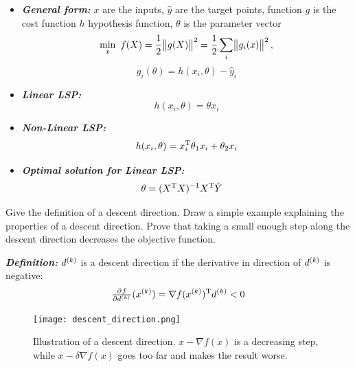 \documentclass[12pt,a4paper]{article}
\begin{document}
\begin{itemize}
    \item[] \textbf{\textit{General form:}} $x$ are the inputs, $\hat{y}$ are the target points, function $g$ is the cost function $h$ hypothesis function, $\theta$ is the parameter vector
        \begin{equation*}
          \underset{x}{\text{min}} \enspace f(X) = \frac{1}{2} \enVert[1]{g(X)}^2 = \frac{1}{2} \sum_i \enVert[1]{g_i(x)}^2,
        \end{equation*}
        \begin{equation*}
          g_i(\theta) = h(x_i, \theta) - \hat{y}_i
        \end{equation*}
    \item[] \textbf{\textit{Linear LSP:}}
        \begin{equation*}
            h(x_i, \theta) = \theta x_i
        \end{equation*}
    \item[] \textbf{\textit{Non-Linear LSP:}}
        \begin{equation*}
            h(x_i, \theta) = x_i^{\mathrm{T}} \theta_{1} x_i + \theta_{2} x_i
        \end{equation*}
    \item[] \textbf{\textit{Optimal solution for Linear LSP:}}
        \begin{align*}
           \theta &= (X^{\mathrm{T}}X)^{-1}X^{\mathrm{T}}\hat{Y}
        \end{align*}
\end{itemize}

\begin{question}
Give the definition of a descent direction. Draw a simple example explaining the properties of a descent direction. Prove that taking a small enough step along the descent direction decreases the objective function.
\end{question}



\textbf{\textit{Definition:}} $d^{(k)}$ is a descent direction if the derivative in direction of $d^{(k)}$ is negative:
  \begin{equation*}
    \pd{f}{{\kth{d}}}(\kth{x}) = \T{\nabla f(\kth{x})} \kth{d} < 0
  \end{equation*}
  
  \begin{figure}
    \centering
    \texttt{[image: descent\_direction.png]}
    \caption{Illustration of a descent direction.  $x-  \nabla f(x)$ is a decreasing step,
      while   $x - \delta \nabla f(x)$ goes too far and makes the result worse.}
    \label{fig:desc_dir}
  \end{figure}
  
\end{document}
